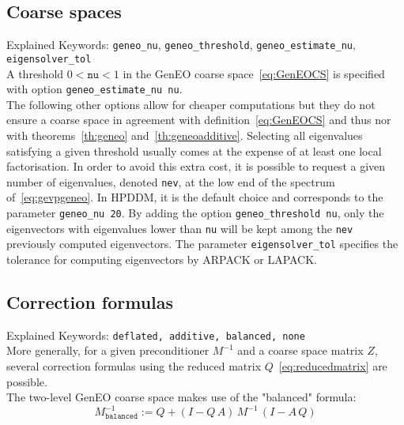\documentclass{article}
\begin{document}
\subsection{Coarse spaces}
Explained Keywords: \texttt{geneo\_nu}, \texttt{geneo\_threshold}, \texttt{geneo\_estimate\_nu}, \texttt{eigensolver\_tol}\\


A threshold $0< \texttt{nu} <1$ in the GenEO coarse space~\eqref{eq:GenEOCS} is specified with option \texttt{geneo\_estimate\_nu nu}.\\
The following other options allow for cheaper computations but they do not ensure a coarse space in agreement with definition~\eqref{eq:GenEOCS} and thus nor with theorems~\ref{th:geneo} and~\ref{th:geneoadditive}. Selecting all eigenvalues satisfying a given threshold usually comes at the expense of at least one local factorisation. In order to avoid this extra cost, it is possible to request a given number of eigenvalues, denoted \texttt{nev}, at the low end of the spectrum of~\eqref{eq:gevpgeneo}.  In HPDDM, it is the default choice and corresponds to the parameter \texttt{geneo\_nu 20}.  By adding the option \texttt{geneo\_threshold nu}, only the eigenvectors with eigenvalues lower than \texttt{nu} will be kept among the \texttt{nev} previously computed eigenvectors. The parameter \texttt{eigensolver\_tol} specifies the tolerance for computing eigenvectors by ARPACK or LAPACK. 


\subsection{Correction formulas}
Explained Keywords: \texttt{deflated, additive, balanced, none}\\

More generally, for a given preconditioner $M^{-1}$ and a coarse space matrix $Z$, several correction formulas using the reduced matrix $Q$~\eqref{eq:reducedmatrix} are possible. \\

The two-level GenEO coarse space makes use of the "balanced" formula:
\begin{equation}
  \label{eq:bnn}
  \boxed{
 M_{\texttt{balanced}}^{-1} := Q+(I-Q\,A)\,M^{-1}\,(I-A\,Q)
 }
\end{equation}
\end{document}
